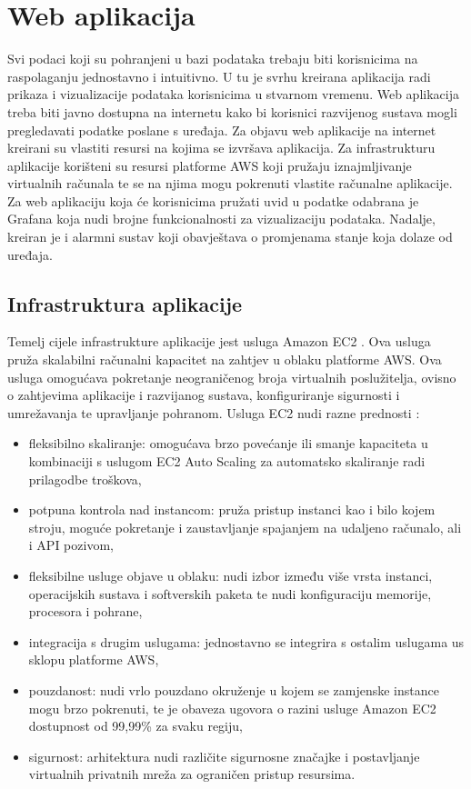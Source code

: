 \chapter{Web aplikacija}

Svi podaci koji su pohranjeni u bazi podataka trebaju biti korisnicima na raspolaganju jednostavno i intuitivno. U tu je svrhu kreirana aplikacija radi prikaza i vizualizacije podataka korisnicima u stvarnom vremenu. Web aplikacija treba biti javno dostupna na internetu kako bi korisnici razvijenog sustava mogli pregledavati podatke poslane s uređaja. Za objavu web aplikacije na internet  kreirani su vlastiti resursi na kojima se izvršava aplikacija. Za infrastrukturu aplikacije korišteni su resursi platforme AWS koji pružaju iznajmljivanje virtualnih računala te se na njima mogu pokrenuti vlastite računalne aplikacije. Za web aplikaciju koja će korisnicima pružati uvid u podatke odabrana je Grafana koja nudi brojne funkcionalnosti za vizualizaciju podataka. Nadalje, kreiran je i alarmni sustav koji obavještava o promjenama stanje koja dolaze od uređaja. 

\section{Infrastruktura aplikacije}

Temelj cijele infrastrukture aplikacije jest usluga Amazon EC2 . Ova usluga pruža skalabilni računalni kapacitet na zahtjev u oblaku platforme AWS. Ova usluga omogućava pokretanje neograničenog broja virtualnih poslužitelja, ovisno o zahtjevima aplikacije i razvijanog sustava, konfiguriranje sigurnosti i umrežavanja te upravljanje pohranom. Usluga EC2 nudi razne prednosti \cite{aws_docs}:
\begin{itemize}
	\item fleksibilno skaliranje: omogućava brzo povećanje ili smanje kapaciteta u kombinaciji s uslugom EC2 Auto Scaling za automatsko skaliranje radi prilagodbe troškova,
	\item potpuna kontrola nad instancom: pruža pristup instanci kao i bilo kojem stroju, moguće pokretanje i zaustavljanje spajanjem na udaljeno računalo, ali i API pozivom,
	\item fleksibilne usluge objave u oblaku: nudi izbor između više vrsta instanci, operacijskih sustava i softverskih paketa te nudi konfiguraciju memorije, procesora i pohrane,
	\item integracija s drugim uslugama: jednostavno se integrira s ostalim uslugama us sklopu platforme AWS,
	\item pouzdanost: nudi vrlo pouzdano okruženje u kojem se zamjenske instance mogu brzo pokrenuti, te je obaveza ugovora o razini usluge Amazon EC2  dostupnost od 99,99\% za svaku regiju,
	\item sigurnost: arhitektura nudi različite sigurnosne značajke i postavljanje virtualnih privatnih mreža za ograničen pristup resursima.
\end{itemize}

